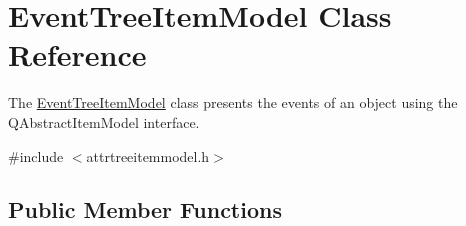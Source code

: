 \hypertarget{class_event_tree_item_model}{\section{\-Event\-Tree\-Item\-Model \-Class \-Reference}
\label{class_event_tree_item_model}
}


\-The \hyperlink{class_event_tree_item_model}{\-Event\-Tree\-Item\-Model} class presents the events of an object using the \-Q\-Abstract\-Item\-Model interface.  




{\ttfamily \#include $<$attrtreeitemmodel.\-h$>$}

\subsection*{\-Public \-Member \-Functions}
